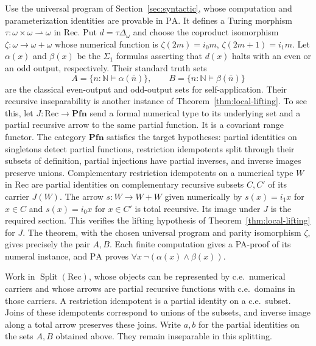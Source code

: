 \documentclass[11pt]{article}
\newcommand{\N}{\mathbb N}
\newcommand{\PA}{\mathrm{PA}}
\newcommand{\Pfn}{\mathbf{Pfn}}
\begin{document}
Use the universal program of Section~\ref{sec:syntactic}, whose
computation and parameterization identities are provable in $\PA$.
It defines a Turing morphism
$\tau:\omega\times\omega\rightharpoonup\omega$ in $\mathrm{Rec}$.
Put $d=\tau\Delta_{\omega}$ and choose the coproduct isomorphism
$\zeta:\omega\to\omega+\omega$ whose numerical function is
$\zeta(2m)=i_0m$, $\zeta(2m+1)=i_1m$.
Let $\alpha(x)$ and $\beta(x)$ be the $\Sigma_1$ formulas asserting
that $d(x)$ halts with an even or an odd output, respectively.
Their standard truth sets
\[
 A=\{n:\N\models\alpha(\bar n)\},\qquad
 B=\{n:\N\models\beta(\bar n)\}
\]
are the classical even-output and odd-output sets for self-application.
Their recursive inseparability is another instance of
Theorem~\ref{thm:local-lifting}. To see this, let
$J:\mathrm{Rec}\to\Pfn$ send a formal numerical type to its underlying
set and a partial recursive arrow to the same partial function.
It is a covariant range functor. The category $\Pfn$ satisfies
the target hypotheses: partial identities on singletons detect partial
functions, restriction idempotents split through their subsets of
definition, partial injections have partial inverses, and inverse images
preserve unions. Complementary restriction idempotents on a numerical type $W$
in $\mathrm{Rec}$ are partial identities on complementary recursive
subsets $C,C'$ of its carrier $J(W)$. The arrow $s:W\to W+W$
given numerically by $s(x)=i_1x$ for $x\in C$ and $s(x)=i_0x$
for $x\in C'$ is total recursive. Its image under $J$ is the
required section. This verifies the lifting hypothesis of
Theorem~\ref{thm:local-lifting} for $J$.
The theorem, with the chosen universal program and parity
isomorphism $\zeta$, gives precisely the pair $A,B$.
Each finite computation gives a PA-proof of its numeral instance, and $\PA$ proves
$\forall x\,\neg(\alpha(x)\land\beta(x))$.

Work in
$\operatorname{Split}(\mathrm{Rec})$, whose objects can be represented
by c.e.\ numerical carriers and whose arrows are partial recursive
functions with c.e.\ domains in those carriers. A restriction idempotent
is a partial identity on a c.e.\ subset. Joins of these idempotents
correspond to unions of the subsets, and inverse image along a total
arrow preserves these joins. Write $a,b$ for the partial
identities on the sets $A,B$ obtained above. They remain inseparable
in this splitting.
\end{document}
